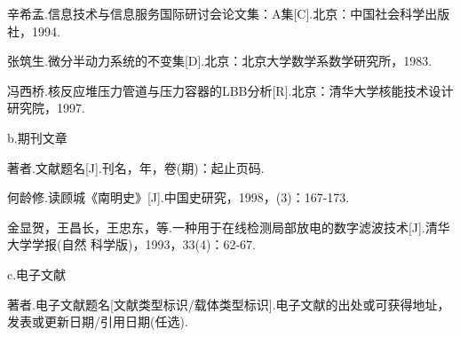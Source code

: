 {\color{red}\noindent
[2]\hspace{5.28bp}辛希孟.\hspace{5.28bp}信息技术与信息服务国际研讨会论文集：A集\nobreak\hspace{0bp}[C].\hspace{5.28bp}北京：中国社会科学出版社，1994.\par
[3]\hspace{5.28bp}张筑生.\hspace{5.28bp}微分半动力系统的不变集\nobreak\hspace{0bp}[D].\hspace{5.28bp}北京：北京大学数学系数学研究所，1983.\par
[4]\hspace{5.28bp}冯西桥.\hspace{5.28bp}核反应堆压力管道与压力容器的LBB分析\nobreak\hspace{0bp}[R].\hspace{5.28bp}北京：清华大学核能技术设计研究院，1997.\par
b.\hspace{5.28bp}期刊文章\par
[序号]\hspace{5.28bp}著者.\hspace{5.28bp}文献题名\nobreak\hspace{0bp}[J].\hspace{5.28bp}刊名，年，卷\nobreak\hspace{0bp}(期)：起止页码.\par
[5]\hspace{5.28bp}何龄修.\hspace{5.28bp}读顾城《南明史》[J].\hspace{5.28bp}中国史研究，1998，(3)：167-173.\par}
{\color{blue}\noindent
{}\hspace{5.28bp}金显贺，王昌长，王忠东，等.\hspace{5.28bp}一种用于在线检测局部放电的数字滤波技术\nobreak\hspace{0bp}[J].\hspace{0bp}清华大学学报\nobreak\hspace{0bp}(自然\linebreak
科学版)，1993，33(4)：62-67.\par}
{\color{red}\noindent
c.\hspace{5.28bp}电子文献\par
[序号]\hspace{5.28bp}著者.\hspace{5.28bp}电子文献题名\nobreak\hspace{0bp}[文献类型标识/载体类型标识].\hspace{5.28bp}电子文献的出处或可获得地址，发表或更新日期/引用日期\nobreak\hspace{0bp}(任选).\par}
